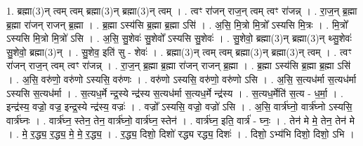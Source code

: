 \documentclass[17pt]{extarticle}
\begin{document}
1. ब्रह्मा(3)न् त्वम् त्वम् ब्रह्मा(3)न् ब्रह्मा(3)न् त्वम् । . त्वꣳ रा॑जन् राज॒न् त्वम् त्वꣳ रा॑जन्न् । . रा॒ज॒न् ब्र॒ह्मा ब्र॒ह्मा रा॑जन् राजन् ब्र॒ह्मा । . ब्र॒ह्मा ऽस्य॑सि ब्र॒ह्मा ब्र॒ह्मा ऽसि॑ । . अ॒सि॒ मि॒त्रो मि॒त्रो᳚ ऽस्यसि मि॒त्रः । . मि॒त्रो᳚ ऽस्यसि मि॒त्रो मि॒त्रो॑ ऽसि । . अ॒सि॒ सु॒शेवः॑ सु॒शेवो᳚ ऽस्यसि सु॒शेवः॑ । . सु॒शेवो॒ ब्रह्मा(3)न् ब्रह्मा(3)न् थ्सु॒शेवः॑ सु॒शेवो॒ ब्रह्मा(3)न् । . सु॒शेव॒ इति॑ सु - शेवः॑ । . ब्रह्मा(3)न् त्वम् त्वम् ब्रह्मा(3)न् ब्रह्मा(3)न् त्वम् । . त्वꣳ रा॑जन् राज॒न् त्वम् त्वꣳ रा॑जन्न् । . रा॒ज॒न् ब्र॒ह्मा ब्र॒ह्मा रा॑जन् राजन् ब्र॒ह्मा । . ब्र॒ह्मा ऽस्य॑सि ब्र॒ह्मा ब्र॒ह्मा ऽसि॑ । . अ॒सि॒ वरु॑णो॒ वरु॑णो ऽस्यसि॒ वरु॑णः । . वरु॑णो ऽस्यसि॒ वरु॑णो॒ वरु॑णो ऽसि । . अ॒सि॒ स॒त्यध॑र्मा स॒त्यध॑र्मा ऽस्यसि स॒त्यध॑र्मा । . स॒त्यध॒र्मे न्द्र॒स्ये न्द्र॑स्य स॒त्यध॑र्मा स॒त्यध॒र्मे न्द्र॑स्य । . स॒त्यध॒र्मेति॑ स॒त्य - ध॒र्मा॒ । . इन्द्र॑स्य॒ वज्रो॒ वज्र॒ इन्द्र॒स्ये न्द्र॑स्य॒ वज्रः॑ । . वज्रो᳚ ऽस्यसि॒ वज्रो॒ वज्रो॑ ऽसि । . अ॒सि॒ वार्त्र॑घ्नो॒ वार्त्र॑घ्नो ऽस्यसि॒ वार्त्र॑घ्नः । . वार्त्र॑घ्न॒ स्तेन॒ तेन॒ वार्त्र॑घ्नो॒ वार्त्र॑घ्न॒ स्तेन॑ । . वार्त्र॑घ्न॒ इति॒ वार्त्र॑ - घ्नः॒ । . तेन॑ मे मे॒ तेन॒ तेन॑ मे । . मे॒ र॒द्ध्य॒ र॒द्ध्य॒ मे॒ मे॒ र॒द्ध्य॒ । . र॒द्ध्य॒ दिशो॒ दिशो॑ रद्ध्य रद्ध्य॒ दिशः॑ । . दिशो॒ ऽभ्य॑भि दिशो॒ दिशो॒ ऽभि । \newline
\end{document}
